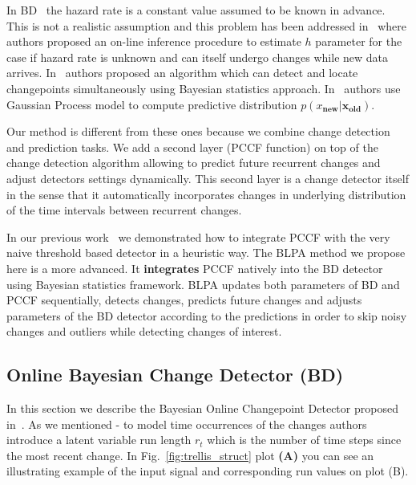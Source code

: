 In BD~\cite{mackay2007} the hazard rate is a constant value assumed to be known in advance.
This is not a realistic assumption and this problem has been addressed in~\cite{WilsonBayesOnline} where authors proposed an on-line inference
procedure to estimate $h$ parameter for the case if hazard rate is unknown and can itself undergo changes while new data
arrives.
In~\cite{DowneyChp} authors proposed an algorithm 
which can detect and locate changepoints simultaneously using Bayesian statistics approach.
In~\cite{saatcci2010gaussian} authors use Gaussian Process model to compute predictive distribution $p(x_{\textbf{new}} | \pmb{x}_{\textbf{old}})$.

Our method is different from these ones because we combine change detection and prediction tasks. 
We add a second layer (PCCF function) on top of the change detection algorithm allowing to predict future recurrent changes and adjust detectors settings dynamically.
This second layer is a change detector itself in the sense that it automatically incorporates changes in underlying distribution of the time intervals between recurrent changes.

In our previous work~\cite{MaslovSDM2016} we demonstrated how to integrate PCCF with the very naive threshold based detector in a heuristic way. 
The BLPA method we propose here is a more advanced.
It \textbf{integrates} PCCF natively into the BD detector using Bayesian statistics framework.
BLPA updates both parameters of BD and PCCF sequentially, detects changes, predicts future changes and adjusts parameters of the BD detector according to the predictions in order to skip noisy changes and outliers while detecting changes of interest.

\subsection{Online Bayesian Change Detector (BD)}
\label{subsec:bd_detector}
In this section we describe the Bayesian Online Changepoint Detector proposed in~\cite{mackay2007}.
As we mentioned - to model time occurrences of the changes authors introduce a latent variable run length $r_t$ which is the number of time steps since the most recent change.
In Fig.~\ref{fig:trellis_struct} plot \textbf{(A)} you can see an illustrating example of the input signal and corresponding run values on plot (B).

